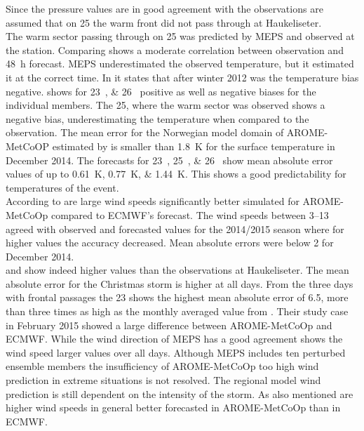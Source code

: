 Since the pressure values are in good agreement with the observations are assumed that on \SI{25}{\dec} the warm front did not pass through at Haukeliseter. 
\\
The warm sector passing through on \SI{25}{\dec} was predicted by MEPS and observed at the station. Comparing  shows a moderate correlation between observation and \SI{48}{\hour} forecast. MEPS underestimated the observed temperature, but it estimated it at the correct time. In \cite{muller_arome-metcoop:_2017} it states that after winter 2012 was the temperature bias negative.  shows for \SIlist{23;26}{\dec} positive as well as negative biases for the individual members. The \SI{25}{\dec}, where the warm sector was observed shows a negative bias, underestimating the temperature when compared to the observation. The mean error for the Norwegian model domain of AROME-MetCoOP estimated by \cite{muller_arome-metcoop:_2017} is smaller than \SI{1.8}{\kelvin} for the surface temperature in December 2014. The forecasts for \SIlist{23;25;26}{\dec} show mean absolute error values of up to \SIlist{0.61;0.77;1.44}{\kelvin}. This shows a good predictability for temperatures of the event. 
\\
According to \cite{muller_arome-metcoop:_2017} are large wind speeds significantly better simulated for AROME-MetCoOp compared to ECMWF's forecast. The wind speeds between \SIrange{3}{13}{\mPs} agreed with observed and forecasted values for the 2014/2015 season where for higher values the accuracy decreased. Mean absolute errors were below \SI{2}{\mPs} for December 2014. 
\\
 and  show indeed higher values than the observations at Haukeliseter. The mean absolute error for the Christmas storm is higher at all days. From the three days with frontal passages the \SI{23}{\dec} shows the highest mean absolute error of \SI{6.5}{\mPs}, more than three times as high as the monthly averaged value from \cite{muller_arome-metcoop:_2017}. Their study case in February 2015 showed a large difference between AROME-MetCoOp and ECMWF. While the wind direction of MEPS has a good agreement shows the wind speed larger values over all days. Although MEPS includes ten perturbed ensemble members the insufficiency of AROME-MetCoOp too high wind prediction in extreme situations is not resolved. The regional model wind prediction is still dependent on the intensity of the storm. As \cite{muller_arome-metcoop:_2017} also mentioned are higher wind speeds in general better forecasted in AROME-MetCoOp than in ECMWF. 
